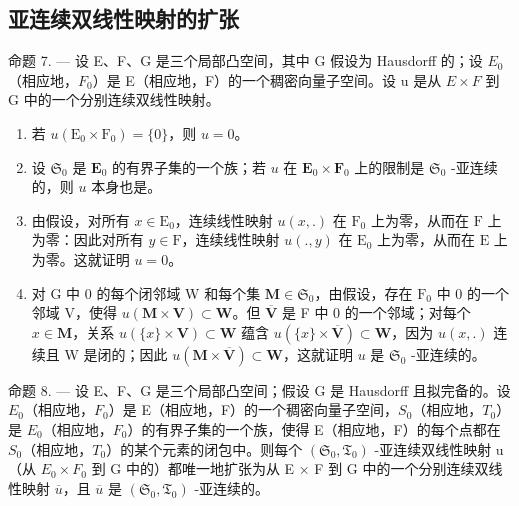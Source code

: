 \subsection{亚连续双线性映射的扩张}

命题 7. --- 设 E、F、G 是三个局部凸空间，其中 G 假设为 Hausdorff 的；设 \(E_{0}\)（相应地，\(F_{0}\)）是 E（相应地，F）的一个稠密向量子空间。设 u 是从 \(E \times F\) 到 G 中的一个分别连续双线性映射。

\begin{enumerate}
\def\labelenumi{\arabic{enumi})}
\item
  若 \(u(\mathrm{E}_0 \times \mathrm{F}_0) = \{0\}\)，则 \(u = 0\)。
\item
  设 \(\mathfrak{S}_0\) 是 \(\mathbf{E}_0\) 的有界子集的一个族；若 \(u\) 在 \(\mathbf{E}_0 \times \mathbf{F}_0\) 上的限制是 \(\mathfrak{S}_0\) -亚连续的，则 \(u\) 本身也是。
\item
  由假设，对所有 \(x \in \mathrm{E}_0\)，连续线性映射 \(u(x, .)\) 在 \(\mathrm{F}_0\) 上为零，从而在 \(\mathrm{F}\) 上为零：因此对所有 \(y \in \mathrm{F}\)，连续线性映射 \(u(., y)\) 在 \(\mathrm{E}_0\) 上为零，从而在 \(\mathrm{E}\) 上为零。这就证明 \(u = 0\)。
\item
  对 G 中 0 的每个闭邻域 W 和每个集 \(\mathbf{M} \in \mathfrak{S}_0\)，由假设，存在 \(\mathrm{F}_0\) 中 0 的一个邻域 V，使得 \(u(\mathbf{M} \times \mathbf{V}) \subset \mathbf{W}\)。但 \(\overline{\mathbf{V}}\) 是 F 中 0 的一个邻域；对每个 \(x \in \mathbf{M}\)，关系 \(u(\{x\} \times \mathbf{V}) \subset \mathbf{W}\) 蕴含 \(u(\{x\} \times \overline{\mathbf{V}}) \subset \mathbf{W}\)，因为 \(u(x, .)\) 连续且 W 是闭的；因此 \(u(\mathbf{M} \times \overline{\mathbf{V}}) \subset \mathbf{W}\)，这就证明 \(u\) 是 \(\mathfrak{S}_0\) -亚连续的。
\end{enumerate}

命题 8. --- 设 E、F、G 是三个局部凸空间；假设 G 是 Hausdorff 且拟完备的。设 \(E_{0}\)（相应地，\(F_{0}\)）是 E（相应地，F）的一个稠密向量子空间，\(S_{0}\)（相应地，\(T_{0}\)）是 \(E_{0}\)（相应地，\(F_{0}\)）的有界子集的一个族，使得 E（相应地，F）的每个点都在 \(S_{0}\)（相应地，\(T_{0}\)）的某个元素的闭包中。则每个 \((\mathfrak{S}_{0}, \mathfrak{T}_{0})\) -亚连续双线性映射 u（从 \(E_{0} \times F_{0}\) 到 G 中的）都唯一地扩张为从 E × F 到 G 中的一个分别连续双线性映射 \(\overline{u}\)，且 \(\overline{u}\) 是 \((\mathfrak{S}_{0}, \mathfrak{T}_{0})\) -亚连续的。

